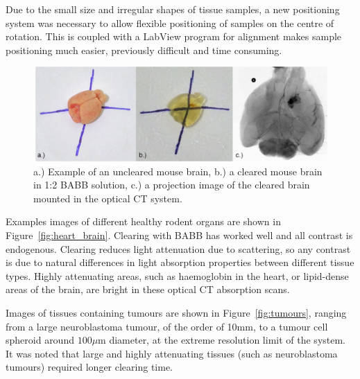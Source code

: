 Due to the small size and irregular shapes of tissue samples, a new positioning system was necessary to allow flexible positioning of samples on the centre of rotation. This is coupled with a LabView program for alignment makes sample positioning much easier, previously difficult and time consuming. 




	\begin{figure}[H]
		\centering
		\includegraphics[width = \textwidth]{meth_img/Brain_J5_clearing.png}
		\caption{a.) Example of an uncleared mouse brain, b.) a cleared mouse brain in 1:2 BABB solution, c.) a projection image of the cleared brain mounted in the optical CT system.}
		\label{fig:clearing}
	\end{figure}







Examples images of different healthy rodent organs are shown in Figure~\ref{fig:heart_brain}. Clearing with BABB has worked well and all contrast is endogenous. Clearing reduces light attenuation due to scattering, so any contrast is due to natural differences in light absorption properties between different tissue types. Highly attenuating areas, such as haemoglobin in the heart, or lipid-dense areas of the brain, are bright in these optical CT absorption scans.

Images of tissues containing tumours are shown in Figure~\ref{fig:tumours}, ranging from a large neuroblastoma tumour, of the order of 10mm, to a tumour cell spheroid around $100\mu$m diameter, at the extreme resolution limit of the system. It was noted that large and highly attenuating tissues (such as neuroblastoma tumours) required longer clearing time.


